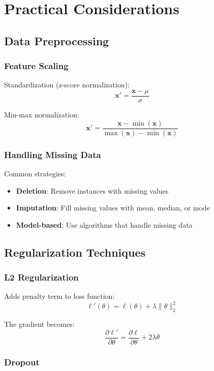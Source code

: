 \documentclass{article}
\begin{document}
\section{Practical Considerations}

\subsection{Data Preprocessing}

\subsubsection{Feature Scaling}

Standardization (z-score normalization):
\[
\mathbf{x}' = \frac{\mathbf{x} - \mu}{\sigma}
\]

Min-max normalization:
\[
\mathbf{x}' = \frac{\mathbf{x} - \min(\mathbf{x})}{\max(\mathbf{x}) - \min(\mathbf{x})}
\]

\subsubsection{Handling Missing Data}

Common strategies:
\begin{itemize}
\item \textbf{Deletion}: Remove instances with missing values
\item \textbf{Imputation}: Fill missing values with mean, median, or mode
\item \textbf{Model-based}: Use algorithms that handle missing data
\end{itemize}

\subsection{Regularization Techniques}

\subsubsection{L2 Regularization}

Adds penalty term to loss function:
\[
\ell'(\theta) = \ell(\theta) + \lambda \|\theta\|_2^2
\]

The gradient becomes:
\[
\frac{\partial \ell'}{\partial \theta} = \frac{\partial \ell}{\partial \theta} + 2\lambda \theta
\]

\subsubsection{Dropout}
\end{document}
